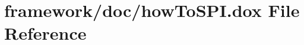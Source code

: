 \hypertarget{how_to_s_p_i_8dox}{}\section{framework/doc/how\+To\+S\+PI.dox File Reference}
\label{how_to_s_p_i_8dox}
